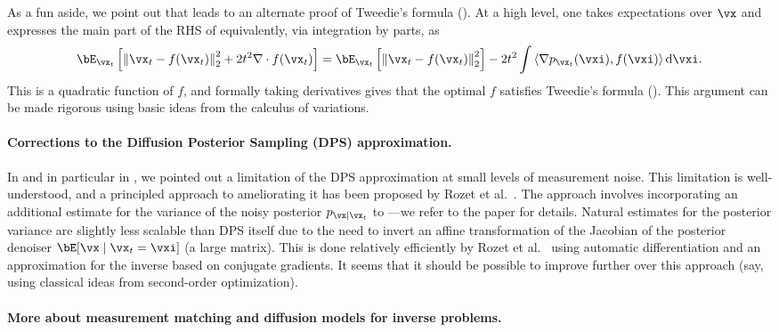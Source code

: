 \documentclass[../../book-main.tex]{subfiles}
\begin{document}
As a fun aside, we point out that  leads to an alternate
proof of Tweedie's formula (). At a high level, one takes
expectations over $\vx$ and expresses the main part of the RHS of
 equivalently, via integration by parts, as
\begin{equation}
  \bE_{\vx_t}\left[
    \norm*{\vx_t - f(\vx_t)}_2^2
    + 2t^2 \nabla \cdot f(\vx_t)
    \right]
  =
  \bE_{\vx_t}\left[
    \norm*{\vx_t - f(\vx_t)}_2^2
    \right]
  - 2t^2 \int
  \ip*{\nabla p_{\vx_t}(\vxi)}{f(\vxi)}
  \odif \vxi.
\end{equation}
This is a quadratic function of $f$, and formally taking derivatives gives
that the optimal $f$ satisfies Tweedie's formula (). This
argument can be made rigorous using basic ideas from the calculus of variations.


\paragraph{Corrections to the Diffusion Posterior Sampling (DPS) approximation.}
In  and in particular in
, we pointed out
a limitation of the DPS approximation
 at
small levels of measurement noise. 
This limitation is well-understood, and a principled approach to ameliorating it
has been proposed by Rozet et al.\ \cite{rozet2024learning}.
The approach involves incorporating an additional estimate for the variance of
the noisy posterior $p_{\vx \mid \vx_t}$ to
---we
refer to the paper for details.
Natural estimates for the posterior variance are slightly less scalable than DPS
itself due to the need to invert an affine transformation of the Jacobian of
the posterior denoiser $\bE[\vx \mid \vx_t=\vxi]$ (a large matrix). This is done
relatively efficiently by Rozet et al.\ \cite{rozet2024learning} using automatic differentiation and an
approximation for the inverse based on conjugate gradients. It seems that it
should be possible to improve further over this approach (say, using classical
ideas from second-order optimization).


\paragraph{More about measurement matching and diffusion models for inverse
problems.} 
\end{document}
